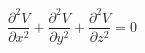 \documentclass[12pt]{article}
\begin{document}
\begin{displaymath}
\frac {\partial ^{2}V} {\partial x^{2}} + \frac {\partial ^{2}V} {\partial y^{2}} + \frac {\partial ^{2}V} {\partial z^{2}} = 0
\end{displaymath}
\end{document}
